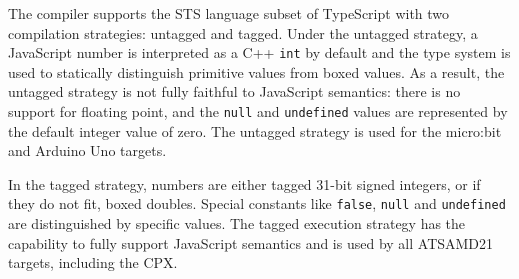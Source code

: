 \label{sec:untagged-tagged}
The \MC compiler supports the STS language subset of TypeScript
with two compilation strategies: untagged and tagged. Under the untagged strategy,
a JavaScript number is interpreted as a C++ \texttt{int} by default and the type system is used
to statically distinguish primitive values from boxed values. As a result, the untagged
strategy is not fully faithful to JavaScript semantics: there is no support for floating
point, and the \texttt{null} and \texttt{undefined} values are represented by the default integer value of zero. The untagged strategy is used for the micro:bit and Arduino Uno targets.

In the tagged strategy, numbers are either tagged 31-bit signed integers, or if they do not fit, boxed doubles. Special constants like \texttt{false}, \texttt{null} and \texttt{undefined} are distinguished by specific values. The tagged execution strategy has the capability to fully support JavaScript semantics and
is used by all ATSAMD21 targets, including the CPX.

